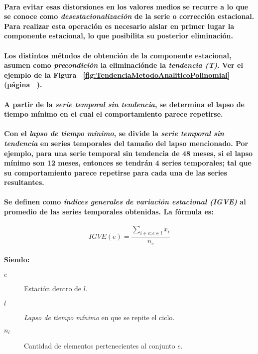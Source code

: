 \paragraph{
Para evitar esas distorsiones en los valores medios se recurre a lo que se conoce como \emph{desestacionalización} de la serie o corrección estacional. Para realizar esta operación es necesario aislar en primer lugar la componente estacional, lo que posibilita su posterior eliminación.
}
\paragraph*{
Los distintos métodos de obtención de la componente estacional, asumen como \emph{precondición} la eliminación\footnotemark[3] de la \emph{tendencia (T)}. Ver el ejemplo de la Figura ~\ref{fig:TendenciaMetodoAnaliticoPolinomial} (página ~\pageref{fig:TendenciaMetodoAnaliticoPolinomial}).
}
\paragraph{
A partir de la \emph{serie temporal sin tendencia}, se determina el lapso de tiempo mínimo en el cual el comportamiento parece repetirse.
}
\paragraph{
Con el \emph{lapso de tiempo mínimo}, se divide la \emph{serie temporal sin tendencia} en series temporales del tamaño del lapso mencionado. Por ejemplo, para una serie temporal sin tendencia de 48 meses, si el lapso mínimo son 12 meses, entonces se tendrán 4 series temporales; tal que su comportamiento parece repetirse para cada una de las series resultantes.
}
\paragraph{
Se definen como \emph{índices generales de variación estacional (IGVE)} al promedio de las series temporales obtenidas. La fórmula es:
}
\begin{equation}
IGVE(e) = \frac{\displaystyle\sum_{i \in e; e \in l} x_i}{n_e}
\end{equation}
\paragraph{
Siendo:
}
\begin{description}
\item[$e$] Estación dentro de $l$.
\item[$l$] \emph{Lapso de tiempo mínimo} en que se repite el ciclo.
\item[$n_l$] Cantidad de elementos pertenecientes al conjunto $e$.
\end{description}
